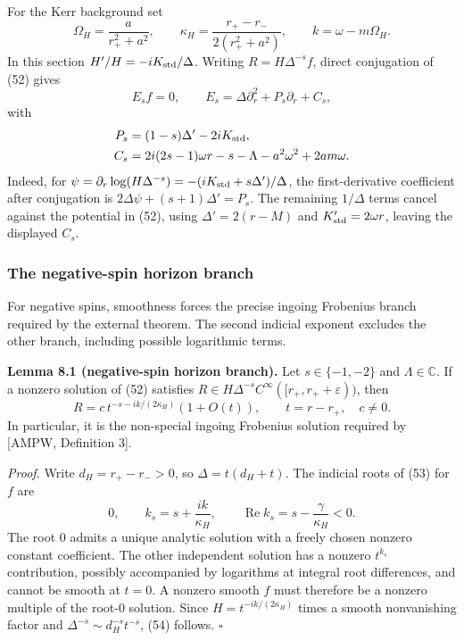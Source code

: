 \documentclass[11pt,a4paper]{article}
\begin{document}
For the Kerr background set \[
 \Omega_H=\frac{a}{r_+^2+a^2},\qquad
 \kappa_H=\frac{r_+-r_-}{2(r_+^2+a^2)},\qquad
 k=\omega-m\Omega_H.
\] In this section \(H'/H=-iK_{\rm std}/\Delta\). Writing
\(R=H\Delta^{-s}f\), direct conjugation of (52) gives \[
 E_sf=0,\qquad E_s=\Delta\partial_r^2+P_s\partial_r+C_s,
 \tag{53}
\] with \[
 \begin{aligned}
 P_s&=(1-s)\Delta'-2iK_{\rm std},\\
 C_s&=2i(2s-1)\omega r-s-\Lambda-a^2\omega^2+2am\omega .
 \end{aligned}
\] Indeed, for \(\psi=\partial_r\log(H\Delta^{-s})
=-(iK_{\rm std}+s\Delta')/\Delta\), the first-derivative coefficient
after conjugation is \(2\Delta\psi+(s+1)\Delta'=P_s\). The remaining
\(1/\Delta\) terms cancel against the potential in (52), using
\(\Delta'=2(r-M)\) and \(K_{\rm std}'=2\omega r\), leaving the displayed
\(C_s\).

\subsubsection{The negative-spin horizon branch}\label{readable-kerr-negative}

For negative spins, smoothness forces the precise ingoing Frobenius branch required by the external theorem. The second indicial exponent excludes the other branch, including possible logarithmic terms.

\textbf{Lemma 8.1 (negative-spin horizon branch).} Let \(s\in\{-1,-2\}\)
and \(\Lambda\in\mathbb C\). If a nonzero solution of (52) satisfies
\(R\in H\Delta^{-s}C^\infty([r_+,r_++\varepsilon))\), then \[
 R=c\,t^{-s-ik/(2\kappa_H)}(1+O(t)),\qquad
 t=r-r_+,\quad c\ne0.
 \tag{54}
\] In particular, it is the non-special ingoing Frobenius solution
required by {[}AMPW, Definition 3{]}.

\emph{Proof.} Write \(d_H=r_+-r_->0\), so \(\Delta=t(d_H+t)\). The
indicial roots of (53) for \(f\) are \[
 0,\qquad k_s=s+\frac{ik}{\kappa_H},\qquad
 \operatorname{Re}k_s=s-\frac{\gamma}{\kappa_H}<0.
\] The root \(0\) admits a unique analytic solution with a freely chosen
nonzero constant coefficient. The other independent solution has a
nonzero \(t^{k_s}\) contribution, possibly accompanied by logarithms at
integral root differences, and cannot be smooth at \(t=0\). A nonzero
smooth \(f\) must therefore be a nonzero multiple of the root-\(0\)
solution. Since \(H=t^{-ik/(2\kappa_H)}\) times a smooth nonvanishing
factor and \(\Delta^{-s}\sim d_H^{-s}t^{-s}\), (54) follows. \(\square\)
\end{document}
